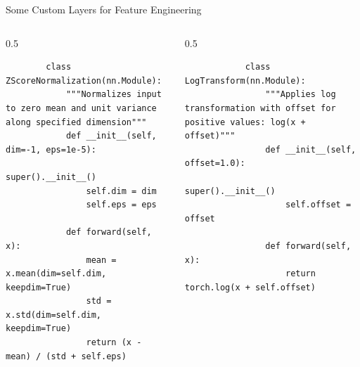 \documentclass[aspectratio=169,xcolor=dvipsnames,svgnames,x11names,fleqn]{beamer}
\begin{document}
\begin{frame}[fragile]{Some Custom Layers for Feature Engineering}

    \begin{columns}
        \begin{column}{0.5\textwidth}
        \begin{verbatim}
        class ZScoreNormalization(nn.Module):
            """Normalizes input to zero mean and unit variance along specified dimension"""
            def __init__(self, dim=-1, eps=1e-5):
                super().__init__()
                self.dim = dim
                self.eps = eps
                
            def forward(self, x):
                mean = x.mean(dim=self.dim, keepdim=True)
                std = x.std(dim=self.dim, keepdim=True)
                return (x - mean) / (std + self.eps)
        \end{verbatim}
        \end{column}

        \begin{column}{0.5\textwidth}
        \begin{verbatim}
            class LogTransform(nn.Module):
                """Applies log transformation with offset for positive values: log(x + offset)"""
                def __init__(self, offset=1.0):
                    super().__init__()
                    self.offset = offset
                    
                def forward(self, x):
                    return torch.log(x + self.offset)
        \end{verbatim}
        \end{column}
        \end{columns}

    
\end{frame}
\end{document}
